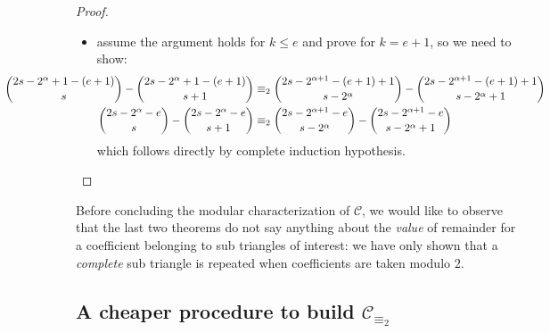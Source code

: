 \begin{proof}
\begin{itemize}
        \item assume the argument holds for $k\leq e$ and prove for $k=e+1$, so we need to show:
            \begin{displaymath}
                \hspace{-3cm}
                \begin{split}
                    {{2s-2^{{\alpha}}+1-(e+1)}\choose{s}} - {{2s-2^{{\alpha}}+1-(e+1)}\choose{s+1}}
                    &\equiv_{2}
                    {{2s-2^{{\alpha}+1}-(e+1)+1}\choose{s-2^{{\alpha}}}} - {{2s-2^{{\alpha}+1}-(e+1)+1}\choose{s-2^{{\alpha}}+1}}\\
                    {{2s-2^{{\alpha}}-e}\choose{s}} - {{2s-2^{{\alpha}}-e}\choose{s+1}}
                    &\equiv_{2}
                    {{2s-2^{{\alpha}+1}-e}\choose{s-2^{{\alpha}}}} - {{2s-2^{{\alpha}+1}-e}\choose{s-2^{{\alpha}}+1}}\\
                \end{split}
            \end{displaymath}
            which follows directly by complete induction hypothesis.
    \end{itemize}
\end{proof}



Before concluding the modular characterization of $\mathcal{C}$, 
we would like to observe that the last two
theorems do not say anything about the \emph{value} of remainder for 
a coefficient belonging to sub triangles of interest: 
we have only shown that a \emph{complete} sub triangle is repeated 
when coefficients are taken modulo $2$. 

\subsection{A cheaper procedure to build $\mathcal{C}_{\equiv_{2}}$}

